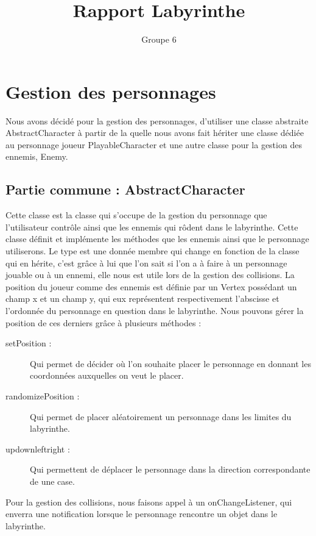 \documentclass [10pt, a4paper]{article}
\title {Rapport Labyrinthe}
\author {Groupe 6}
\begin{document}
\maketitle
\newpage

\tableofcontents
\newpage

\section {Gestion des personnages}
Nous avons décidé pour la gestion des personnages, d'utiliser une classe abstraite AbstractCharacter à partir de la quelle nous avons fait hériter une classe dédiée au personnage joueur PlayableCharacter et une autre classe pour la gestion des ennemis, Enemy.

\subsection {Partie commune : AbstractCharacter}
Cette classe est la classe qui s'occupe de la gestion du personnage que l'utilisateur contrôle ainsi que les ennemis qui rôdent dans le labyrinthe. Cette classe définit et implémente les méthodes que les ennemis ainsi que le personnage utiliserons. Le type est une donnée membre qui change en fonction de la classe qui en hérite, c'est grâce à lui que l'on sait si l'on a à faire à un personnage jouable ou à un ennemi, elle nous est utile lors de la gestion des collisions. La position du joueur comme des ennemis est définie par un Vertex possédant un champ x et un champ y, qui eux représentent respectivement l'abscisse et l'ordonnée du personnage en question dans le labyrinthe. Nous pouvons gérer la position de ces derniers grâce à plusieurs méthodes :
\begin {description}
\item  [setPosition :]             Qui permet de décider où l'on souhaite placer le personnage en donnant les coordonnées auxquelles on veut le placer.
\item  [randomizePosition :]       Qui permet de placer aléatoirement un personnage dans les limites du labyrinthe.
\item  [up\/down\/left\/right\/ :] Qui permettent de déplacer le personnage dans la direction correspondante de une case.
\end   {description}
Pour la gestion des collisions, nous faisons appel à un onChangeListener, qui enverra une notification lorsque le personnage rencontre un objet dans le labyrinthe.
\end{document}
